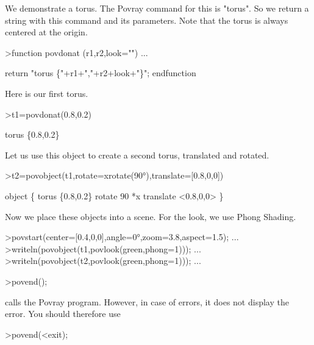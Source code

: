 \documentclass[a4paper,10pt]{article}
\begin{document}
\begin{eulernotebook}
\begin{eulercomment}
We demonstrate a torus. The Povray command for this is "torus". So we
return a string with this command and its parameters. Note that the
torus is always centered at the origin.
\end{eulercomment}
\begin{eulerprompt}
>function povdonat (r1,r2,look="") ...
\end{eulerprompt}
\begin{eulerudf}
    return "torus \{"+r1+","+r2+look+"\}";
  endfunction
\end{eulerudf}
\begin{eulercomment}
Here is our first torus.
\end{eulercomment}
\begin{eulerprompt}
>t1=povdonat(0.8,0.2)
\end{eulerprompt}
\begin{euleroutput}
  torus \{0.8,0.2\}
\end{euleroutput}
\begin{eulercomment}
Let us use this object to create a second torus, translated and
rotated.
\end{eulercomment}
\begin{eulerprompt}
>t2=povobject(t1,rotate=xrotate(90°),translate=[0.8,0,0])
\end{eulerprompt}
\begin{euleroutput}
  object \{ torus \{0.8,0.2\}
   rotate 90 *x 
   translate <0.8,0,0>
   \}
\end{euleroutput}
\begin{eulercomment}
Now we place these objects into a scene. For the look, we use Phong
Shading.
\end{eulercomment}
\begin{eulerprompt}
>povstart(center=[0.4,0,0],angle=0°,zoom=3.8,aspect=1.5); ...
>writeln(povobject(t1,povlook(green,phong=1))); ...
>writeln(povobject(t2,povlook(green,phong=1))); ...
\end{eulerprompt}
\begin{eulerttcomment}
 >povend();
\end{eulerttcomment}
\begin{eulercomment}
calls the Povray program. However, in case of errors, it does not
display the error. You should therefore use

\end{eulercomment}
\begin{eulerttcomment}
 >povend(<exit);
\end{eulerttcomment}
\begin{eulercomment}


\end{eulercomment}
\end{eulernotebook}
\end{document}
